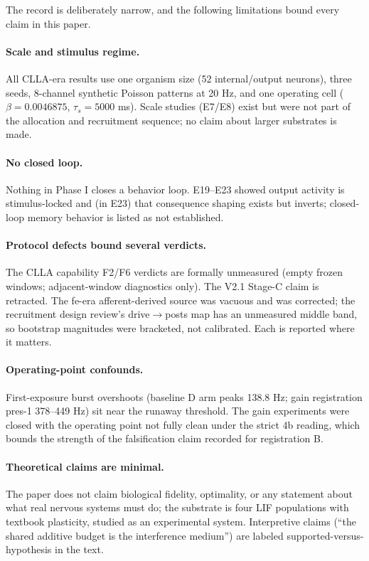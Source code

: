 The record is deliberately narrow, and the following limitations bound
every claim in this paper.

\paragraph{Scale and stimulus regime.}
All CLLA-era results use one organism size (52 internal/output
neurons), three seeds, 8-channel synthetic Poisson patterns at 20 Hz,
and one operating cell (\(\beta = 0.0046875\), \(\tau_s = 5000\) ms).
Scale studies (E7/E8) exist but were not part of the allocation and
recruitment sequence; no claim about larger substrates is made.

\paragraph{No closed loop.}
Nothing in Phase I closes a behavior loop. E19--E23 showed output
activity is stimulus-locked and (in E23) that consequence shaping
exists but inverts; closed-loop memory behavior is listed as not
established.

\paragraph{Protocol defects bound several verdicts.}
The CLLA capability F2/F6 verdicts are formally unmeasured (empty
frozen windows; adjacent-window diagnostics only). The V2.1 Stage-C
claim is retracted. The fe-era afferent-derived source was vacuous and
was corrected; the recruitment design review's drive\(\to\)posts map
has an unmeasured middle band, so bootstrap magnitudes were bracketed,
not calibrated. Each is reported where it matters.

\paragraph{Operating-point confounds.}
First-exposure burst overshoots (baseline D arm peaks 138.8 Hz;
gain registration pres-1 378--449 Hz) sit near the runaway threshold.
The gain experiments were closed with the operating point not fully
clean under the strict 4b reading, which bounds the strength of the
falsification claim recorded for registration B.

\paragraph{Theoretical claims are minimal.}
The paper does not claim biological fidelity, optimality, or any
statement about what real nervous systems must do; the substrate is
four LIF populations with textbook plasticity, studied as an
experimental system. Interpretive claims (``the shared additive budget
is the interference medium'') are labeled supported-versus-hypothesis
in the text.

